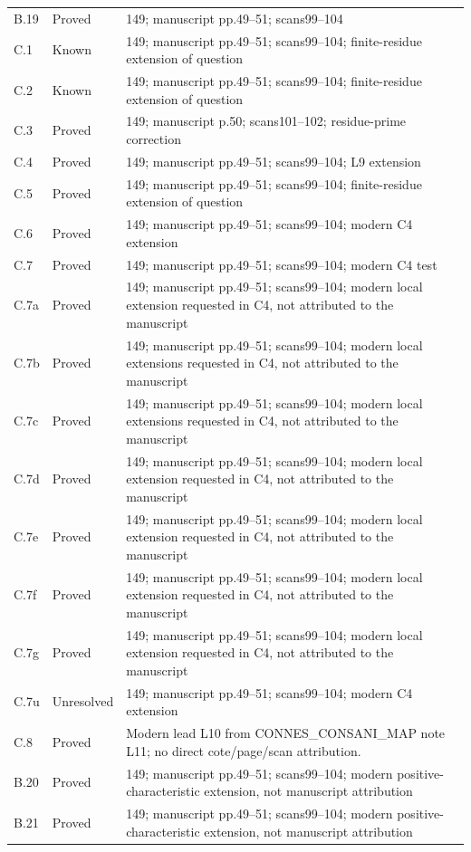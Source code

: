 {\begin{longtable}{p{1.9cm}p{1.7cm}p{10.3cm}}
B.19 & Proved & 149; manuscript pp.49–51; scans99–104 \\
C.1 & Known & 149; manuscript pp.49–51; scans99–104; finite-residue extension of question \\
C.2 & Known & 149; manuscript pp.49–51; scans99–104; finite-residue extension of question \\
C.3 & Proved & 149; manuscript p.50; scans101–102; residue-prime correction \\
C.4 & Proved & 149; manuscript pp.49–51; scans99–104; L9 extension \\
C.5 & Proved & 149; manuscript pp.49–51; scans99–104; finite-residue extension of question \\
C.6 & Proved & 149; manuscript pp.49–51; scans99–104; modern C4 extension \\
C.7 & Proved & 149; manuscript pp.49–51; scans99–104; modern C4 test \\
C.7a & Proved & 149; manuscript pp.49–51; scans99–104; modern local extension requested in C4, not attributed to the manuscript \\
C.7b & Proved & 149; manuscript pp.49–51; scans99–104; modern local extensions requested in C4, not attributed to the manuscript \\
C.7c & Proved & 149; manuscript pp.49–51; scans99–104; modern local extensions requested in C4, not attributed to the manuscript \\
C.7d & Proved & 149; manuscript pp.49–51; scans99–104; modern local extension requested in C4, not attributed to the manuscript \\
C.7e & Proved & 149; manuscript pp.49–51; scans99–104; modern local extension requested in C4, not attributed to the manuscript \\
C.7f & Proved & 149; manuscript pp.49–51; scans99–104; modern local extension requested in C4, not attributed to the manuscript \\
C.7g & Proved & 149; manuscript pp.49–51; scans99–104; modern local extension requested in C4, not attributed to the manuscript \\
C.7u & Unresolved & 149; manuscript pp.49–51; scans99–104; modern C4 extension \\
C.8 & Proved & Modern lead L10 from CONNES\_CONSANI\_MAP note L11; no direct cote/page/scan attribution. \\
B.20 & Proved & 149; manuscript pp.49–51; scans99–104; modern positive-characteristic extension, not manuscript attribution \\
B.21 & Proved & 149; manuscript pp.49–51; scans99–104; modern positive-characteristic extension, not manuscript attribution \\

\end{longtable}}
